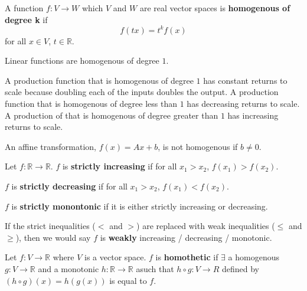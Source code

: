 \documentclass[compress]{beamer}
\def\R{\mathbb{R}}
\renewcommand{\to}{{\rightarrow}}
\begin{document}
\begin{frame}
  \begin{definition}
    A function $f: V \to W$ which $V$ and $W$ are real vector spaces is
    \textbf{homogenous of degree k} if 
    \[ f( t x) = t^k f(x) \]
    for all $x \in V$, $t \in \R$.
  \end{definition}
\end{frame}
\begin{frame}[shrink]
  \begin{example}
    Linear functions are homogenous of degree $1$.
  \end{example}
  \begin{example}
    A production function that is homogenous of degree $1$ has constant
    returns to scale because doubling each of the inputs doubles the
    output. A production function that is homogenous of degree less than
    $1$ has decreasing returns to scale. A production of that is
    homogenous of degree greater than $1$ has increasing returns to
    scale. 
  \end{example}
  \begin{example}
    An affine transformation, $f(x) = Ax + b$, is not homogenous if $b
    \neq 0$. 
  \end{example}
\end{frame}

\begin{frame}
  \begin{definition}
    Let $f: \R \to \R$. $f$ is \textbf{strictly increasing} if for all
    $x_1 > x_2$, $f(x_1) > f(x_2)$.
    
    $f$ is  \textbf{strictly decreasing} if for all
    $x_1 > x_2$, $f(x_1) < f(x_2)$.
    
    $f$ is \textbf{strictly monontonic} if it is either strictly
    increasing or decreasing. 
    
    If the strict inequalities ($<$ and $>$) are replaced with weak
    inequalities ($\leq$ and $\geq$), then we would say $f$ is
    \textbf{weakly} increasing / decreasing / monotonic. 
  \end{definition}
\end{frame}

\begin{frame}
  \begin{definition}
    Let $f: V \to \R$ where $V$ is a vector space. $f$ is
    \textbf{homothetic} if $\exists$ a homogenous $g: V \to \R$ and a
    monotonic $h: \R \to \R$ asuch that $h \circ g: V \to R$ defined by
    $(h \circ g) (x) = h(g(x))$ is equal to $f$.
  \end{definition}
\end{frame}
\end{document}
